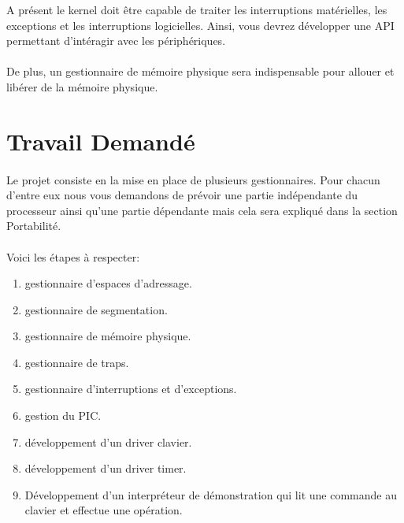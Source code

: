 \documentclass[10pt,a4wide]{article}
\begin{document}
A pr\'esent le kernel doit \^etre capable de traiter les interruptions
mat\'erielles, les exceptions et les interruptions logicielles. Ainsi,
vous devrez d\'evelopper une API permettant d'int\'eragir avec les
p\'eriph\'eriques.

\paragraph{}

De plus, un gestionnaire de m\'emoire physique sera indispensable pour allouer
et lib\'erer de la m\'emoire physique.

\section{Travail Demand\'e}

\paragraph{}

Le projet consiste en la mise en place de plusieurs gestionnaires. Pour chacun
d'entre eux nous vous demandons de pr\'evoir une partie ind\'ependante du
processeur ainsi qu'une partie d\'ependante mais cela sera expliqu\'e
dans la section Portabilit\'e.

\paragraph{}

Voici les \'etapes \`a respecter:

\begin{enumerate}
\item gestionnaire d'espaces d'adressage.
\item gestionnaire de segmentation.
\item gestionnaire de m\'emoire physique.
\item gestionnaire de traps.
\item gestionnaire d'interruptions et d'exceptions.
\item gestion du PIC.
\item d\'eveloppement d'un driver clavier.
\item d\'eveloppement d'un driver timer.
\item D\'eveloppement d'un interpr\'eteur de d\'emonstration qui lit
      une commande au clavier et effectue une op\'eration.
\end{enumerate}
\end{document}
